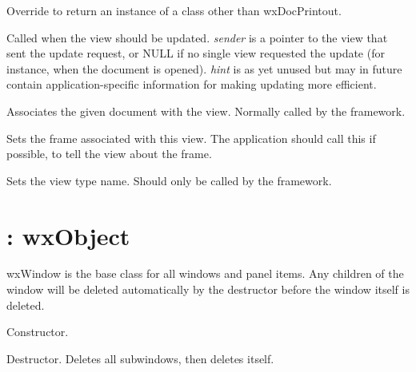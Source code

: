 Override to return an instance of a class other than wxDocPrintout.



Called when the view should be updated. {\it sender} is a pointer to the view
that sent the update request, or NULL if no single view requested the update (for instance,
when the document is opened). {\it hint} is as yet unused but may in future contain
application-specific information for making updating more efficient.



Associates the given document with the view. Normally called by the
framework.



Sets the frame associated with this view. The application should call this
if possible, to tell the view about the frame.



Sets the view type name. Should only be called by the framework.


\section{: wxObject}\label{wxwindow}


wxWindow is the base class for all windows and panel items.  Any
children of the window will be deleted automatically by the destructor
before the window itself is deleted.



Constructor.



Destructor. Deletes all subwindows, then deletes itself.


